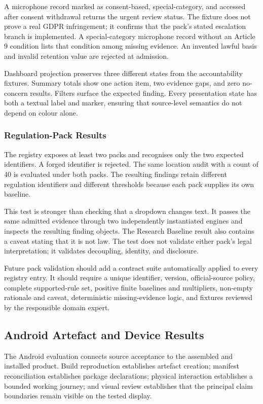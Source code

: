 A microphone record marked as consent-based, special-category, and accessed after consent withdrawal returns the urgent review status. The fixture does not prove a real GDPR infringement; it confirms that the pack's stated escalation branch is implemented. A special-category microphone record without an Article 9 condition lists that condition among missing evidence. An invented lawful basis and invalid retention value are rejected at admission.

Dashboard projection preserves three different states from the accountability fixtures. Summary totals show one action item, two evidence gaps, and zero no-concern results. Filters surface the expected finding. Every presentation state has both a textual label and marker, ensuring that source-level semantics do not depend on colour alone.

\subsubsection{Regulation-Pack Results}

The registry exposes at least two packs and recognises only the two expected identifiers. A forged identifier is rejected. The same location audit with a count of 40 is evaluated under both packs. The resulting findings retain different regulation identifiers and different thresholds because each pack supplies its own baseline.

This test is stronger than checking that a dropdown changes text. It passes the same admitted evidence through two independently instantiated engines and inspects the resulting finding objects. The Research Baseline result also contains a caveat stating that it is not law. The test does not validate either pack's legal interpretation; it validates decoupling, identity, and disclosure.

Future pack validation should add a contract suite automatically applied to every registry entry. It should require a unique identifier, version, official-source policy, complete supported-rule set, positive finite baselines and multipliers, non-empty rationale and caveat, deterministic missing-evidence logic, and fixtures reviewed by the responsible domain expert.

\subsection{Android Artefact and Device Results}

The Android evaluation connects source acceptance to the assembled and installed product. Build reproduction establishes artefact creation; manifest reconciliation establishes package declarations; physical interaction establishes a bounded working journey; and visual review establishes that the principal claim boundaries remain visible on the tested display.

